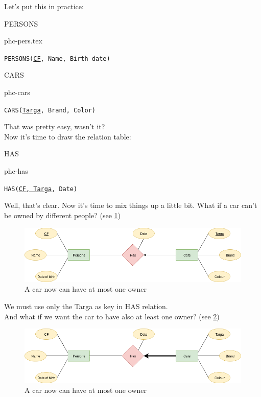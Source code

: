 \documentclass[class=book, crop=false, oneside]{standalone}
\begin{document}
Let's put this in practice:
\vskip 20pt
\begin{minipage}{0.45\textwidth}
	PERSONS
	\begin{table}[H]
		\centering
		{phc-pers.tex}
	\end{table}
	\texttt{PERSONS(\underline{CF}, Name, Birth date)}
\end{minipage}
\hspace{.1\textwidth}
\begin{minipage}{.45\textwidth}
	CARS
	\begin{table}[H]
		\centering
		{phc-cars}
	\end{table}
	\texttt{CARS(\underline{Targa}, Brand, Color)}
\end{minipage}
\vskip 20pt
That was pretty easy, wasn't it?\\
Now it's time to draw the relation table:
\vskip 20pt
\begin{minipage}{.7\textwidth}
	HAS
	\begin{table}[H]
		{phc-has}
	\end{table}
	\texttt{HAS(\underline{CF, Targa}, Date)}
\end{minipage}
\vskip 20pt
Well, that's clear. Now it's time to mix things up a little bit.
What if a car can't be owned by different people? (see \ref{diagram1_01})
\begin{figure}[H]
	\centering
	\includegraphics[width=\textwidth,keepaspectratio]{diagram1_01.png}
	\caption{A car now can have at most one owner}
	\label{diagram1_01}
\end{figure}
We must use only the Targa as key in HAS relation.
\\
And what if we want the car to have also at least one owner? (see \ref{diagram1_02})
\begin{figure}[H]
	\centering
	\includegraphics[width=\textwidth,keepaspectratio]{diagram1_02.png}
	\caption{A car now can have at most one owner}
	\label{diagram1_02}
\end{figure}
\end{document}
